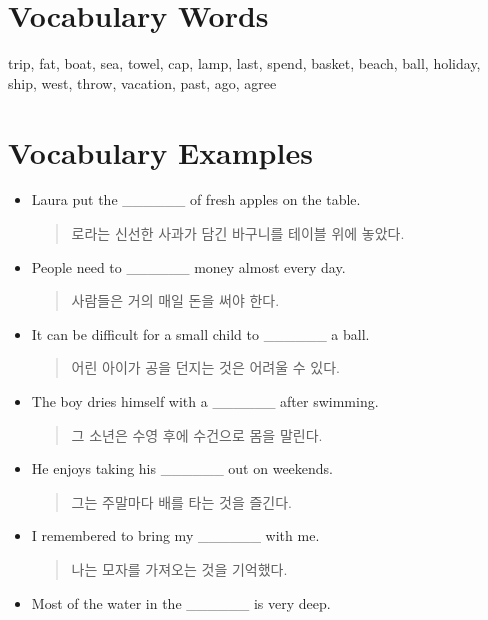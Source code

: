 \documentclass{article}
\begin{document}
\renewcommand{\familydefault}{\sfdefault}
\onehalfspacing
\fontsize{12pt}{14pt}\selectfont

\section*{Vocabulary Words}
\begin{addmargin}[1em]{1em}
trip, fat, boat, sea, towel, cap, lamp, last, spend, basket, beach, ball, holiday, ship, west, throw, vacation, past, ago, agree
\end{addmargin}

\section*{Vocabulary Examples}
\begin{addmargin}[1em]{1em}
\begin{itemize}
    \item Laura put the \_\_\_\_\_\_ of fresh apples on the table.
    \begin{quote}
    로라는 신선한 사과가 담긴 바구니를 테이블 위에 놓았다.
    \end{quote}
    \item People need to \_\_\_\_\_\_ money almost every day.
    \begin{quote}
    사람들은 거의 매일 돈을 써야 한다.
    \end{quote}
    \item It can be difficult for a small child to \_\_\_\_\_\_ a ball.
    \begin{quote}
    어린 아이가 공을 던지는 것은 어려울 수 있다.
    \end{quote}
    \item The boy dries himself with a \_\_\_\_\_\_ after swimming.
    \begin{quote}
    그 소년은 수영 후에 수건으로 몸을 말린다.
    \end{quote}
    \item He enjoys taking his \_\_\_\_\_\_ out on weekends.
    \begin{quote}
    그는 주말마다 배를 타는 것을 즐긴다.
    \end{quote}
    \item I remembered to bring my \_\_\_\_\_\_ with me.
    \begin{quote}
    나는 모자를 가져오는 것을 기억했다.
    \end{quote}
    \item Most of the water in the \_\_\_\_\_\_ is very deep.

\end{itemize}
\end{addmargin}
\end{document}
